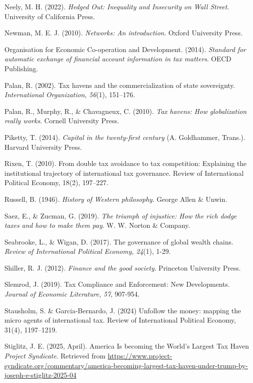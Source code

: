\begin{thebibliography}{99}
Neely, M. H. (2022). \textit{Hedged Out: Inequality and Insecurity on Wall Street}. University of California Press.

Newman, M. E. J. (2010). \textit{Networks: An introduction}. Oxford University Press.

Organisation for Economic Co-operation and Development. (2014). \textit{Standard for automatic exchange of financial account information in tax matters}. OECD Publishing. 

Palan, R. (2002). Tax havens and the commercialization of state sovereignty. \textit{International Organization, 56}(1), 151–176. 

Palan, R., Murphy, R., \& Chavagneux, C. (2010). \textit{Tax havens: How globalization really works}. Cornell University Press.

Piketty, T. (2014). \textit{Capital in the twenty-first century} (A. Goldhammer, Trans.). Harvard University Press.

Rixen, T. (2010). From double tax avoidance to tax competition: Explaining the institutional trajectory of international tax governance. Review of International Political Economy, 18(2), 197–227. 

Russell, B. (1946). \textit{History of Western philosophy}. George Allen \& Unwin.

Saez, E., \& Zucman, G. (2019). \textit{The triumph of injustice: How the rich dodge taxes and how to make them pay}. W. W. Norton \& Company.

Seabrooke, L., \& Wigan, D. (2017). The governance of global wealth chains. \textit{Review of International Political Economy, 24}(1), 1-29. 

Shiller, R. J. (2012). \textit{Finance and the good society}. Princeton University Press.

Slemrod, J. (2019). Tax Compliance and Enforcement: New Developments. \textit{Journal of Economic Literature, 57}, 907-954. 

Stausholm, S. \& Garcia-Bernardo, J. (2024) Unfollow the money: mapping the micro agents of international tax. Review of International Political Economy, 31(4), 1197–1219. 

Stiglitz, J. E. (2025, April). America Is becoming the World's Largest Tax Haven \textit{Project Syndicate}. Retrieved from \url{https://www.project-syndicate.org/commentary/america-becoming-largest-tax-haven-under-trump-by-joseph-e-stiglitz-2025-04}


\end{thebibliography}
